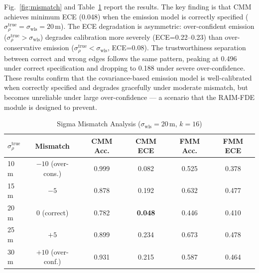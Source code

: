 \documentclass[letterpaper,journal]{IEEEtran}
\begin{document}
Fig.~\ref{fig:mismatch} and Table~\ref{tab:mismatch} report the results. The key finding is that CMM achieves minimum ECE (0.048) when the emission model is correctly specified ($\sigma_{\rho}^{\text{true}}=\sigma_{\text{wls}}=20$\,m). The ECE degradation is asymmetric: over-confident emission ($\sigma_{\rho}^{\text{true}}>\sigma_{\text{wls}}$) degrades calibration more severely (ECE=0.22--0.23) than over-conservative emission ($\sigma_{\rho}^{\text{true}}<\sigma_{\text{wls}}$, ECE=0.08). The trustworthiness separation between correct and wrong edges follows the same pattern, peaking at 0.496 under correct specification and dropping to 0.188 under severe over-confidence. These results confirm that the covariance-based emission model is well-calibrated when correctly specified and degrades gracefully under moderate mismatch, but becomes unreliable under large over-confidence --- a scenario that the RAIM-FDE module is designed to prevent.

\begin{table}[htbp]
\centering
\caption{Sigma Mismatch Analysis ($\sigma_{\text{wls}}=20$\,m, $k=16$)}
\label{tab:mismatch}
\footnotesize
\setlength{\tabcolsep}{2.5pt}
\begin{tabular}{lccccc}
\toprule
$\sigma_{\rho}^{\text{true}}$ & Mismatch & CMM Acc. & CMM ECE & FMM Acc. & FMM ECE \\
\midrule
10\,m & $-10$ (over-cons.) & 0.999 & 0.082 & 0.525 & 0.378 \\
15\,m & $-5$ & 0.878 & 0.192 & 0.632 & 0.477 \\
20\,m & $0$ (correct)    & 0.782 & \textbf{0.048} & 0.446 & 0.410 \\
25\,m & $+5$ & 0.899 & 0.234 & 0.673 & 0.478 \\
30\,m & $+10$ (over-conf.)& 0.931 & 0.215 & 0.587 & 0.464 \\
\bottomrule
\end{tabular}
\end{table}
\end{document}
